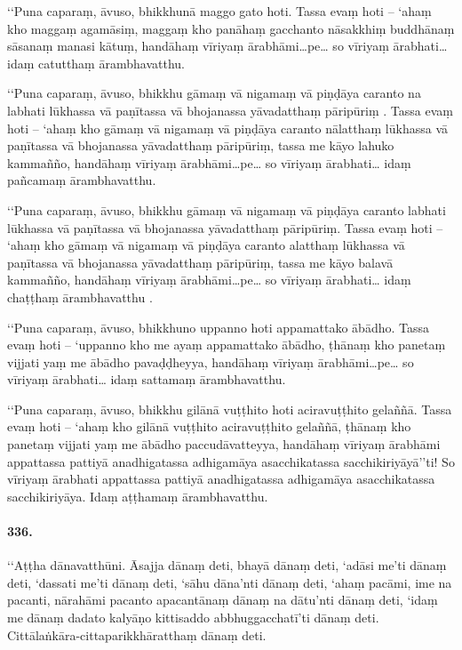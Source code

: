 ‘‘Puna caparaṃ, āvuso, bhikkhunā maggo gato hoti. Tassa evaṃ hoti – ‘ahaṃ kho maggaṃ agamāsiṃ, maggaṃ kho panāhaṃ gacchanto nāsakkhiṃ buddhānaṃ sāsanaṃ manasi kātuṃ, handāhaṃ vīriyaṃ ārabhāmi…pe… so vīriyaṃ ārabhati… idaṃ catutthaṃ ārambhavatthu.

‘‘Puna caparaṃ, āvuso, bhikkhu gāmaṃ vā nigamaṃ vā piṇḍāya caranto na labhati lūkhassa vā paṇītassa vā bhojanassa yāvadatthaṃ pāripūriṃ . Tassa evaṃ hoti – ‘ahaṃ kho gāmaṃ vā nigamaṃ vā piṇḍāya caranto nālatthaṃ lūkhassa vā paṇītassa vā bhojanassa yāvadatthaṃ pāripūriṃ, tassa me kāyo lahuko kammañño, handāhaṃ vīriyaṃ ārabhāmi…pe… so vīriyaṃ ārabhati… idaṃ pañcamaṃ ārambhavatthu.

‘‘Puna caparaṃ, āvuso, bhikkhu gāmaṃ vā nigamaṃ vā piṇḍāya caranto labhati lūkhassa vā paṇītassa vā bhojanassa yāvadatthaṃ pāripūriṃ. Tassa evaṃ hoti – ‘ahaṃ kho gāmaṃ vā nigamaṃ vā piṇḍāya caranto alatthaṃ lūkhassa vā paṇītassa vā bhojanassa yāvadatthaṃ pāripūriṃ, tassa me kāyo balavā kammañño, handāhaṃ vīriyaṃ ārabhāmi…pe… so vīriyaṃ ārabhati… idaṃ chaṭṭhaṃ ārambhavatthu .

‘‘Puna caparaṃ, āvuso, bhikkhuno uppanno hoti appamattako ābādho. Tassa evaṃ hoti – ‘uppanno kho me ayaṃ appamattako ābādho, ṭhānaṃ kho panetaṃ vijjati yaṃ me ābādho pavaḍḍheyya, handāhaṃ vīriyaṃ ārabhāmi…pe… so vīriyaṃ ārabhati… idaṃ sattamaṃ ārambhavatthu.

‘‘Puna caparaṃ, āvuso, bhikkhu gilānā vuṭṭhito hoti aciravuṭṭhito gelaññā. Tassa evaṃ hoti – ‘ahaṃ kho gilānā vuṭṭhito aciravuṭṭhito gelaññā, ṭhānaṃ kho panetaṃ vijjati yaṃ me ābādho paccudāvatteyya, handāhaṃ vīriyaṃ ārabhāmi appattassa pattiyā anadhigatassa adhigamāya asacchikatassa sacchikiriyāyā’’ti! So vīriyaṃ ārabhati appattassa pattiyā anadhigatassa adhigamāya asacchikatassa sacchikiriyāya. Idaṃ aṭṭhamaṃ ārambhavatthu.

\paragraph{336.} ‘‘Aṭṭha dānavatthūni. Āsajja dānaṃ deti, bhayā dānaṃ deti, ‘adāsi me’ti dānaṃ deti, ‘dassati me’ti dānaṃ deti, ‘sāhu dāna’nti dānaṃ deti, ‘ahaṃ pacāmi, ime na pacanti, nārahāmi pacanto apacantānaṃ dānaṃ na dātu’nti dānaṃ deti, ‘idaṃ me dānaṃ dadato kalyāṇo kittisaddo abbhuggacchatī’ti dānaṃ deti. Cittālaṅkāra-cittaparikkhāratthaṃ dānaṃ deti.

